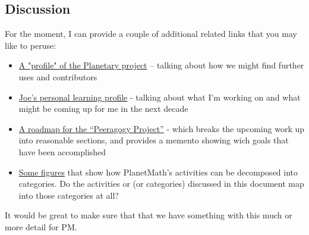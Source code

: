 \subsection{Discussion}
For the moment, I can provide a couple of additional related links
that you may like to peruse:
\begin{itemize}
\item \href{http://campus.ftacademy.org/wiki/index.php/Seed_Project:_Planetary}{A "profile" of the Planetary project} -- talking about how we might
find further uses and contributors
\item \href{http://en.wikiversity.org/wiki/User:Arided/Paragogical_Profile}{Joe's 
personal learning profile} - talking about what I'm working on and what might be
coming up for me in the next decade
\item \href{http://peeragogy.org/peeragogy-org-roadmap/}{A roadmap for the ``Peeragogy Project''} - which breaks the upcoming work up into reasonable sections, and provides a memento showing wich goals that have been accomplished
\item \href{http://metameso.org/~joe/thesis-outline.html}{Some figures} 
that show how PlanetMath's activities can be decomposed into categories. 
Do the activities or (or categories) discussed in this document map
into those categories at all?
\end{itemize}
It would be great to make sure that that we have something with this much or more detail for PM.
